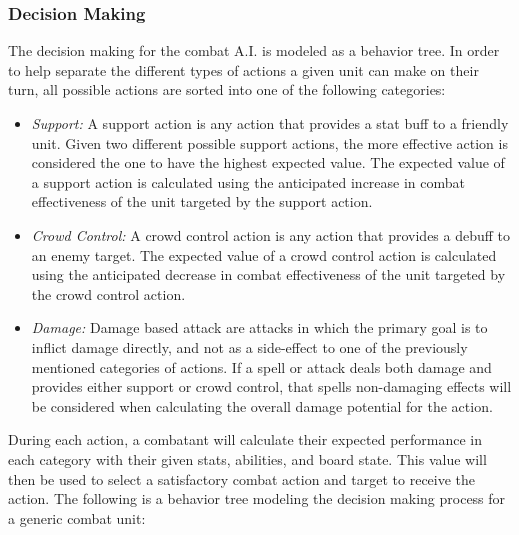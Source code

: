 \documentclass[letterpaper, 10 pt, conference]{ieeeconf}
\begin{document}
\subsubsection{Decision Making}
The decision making for the combat A.I. is modeled as a behavior tree. In order to help separate the different types of actions a given unit can make
on their turn, all possible actions are sorted into one of the following categories:
\begin{itemize}
	\item \textit{Support:}  A support action is any action that provides a stat buff to a
	friendly unit. Given two different possible support actions, the more effective
	action is considered the one to have the highest expected value. The
	expected value of a support action is calculated using the anticipated increase
	in combat effectiveness of the unit targeted by the support action. \\
	\item \textit{Crowd Control:} A crowd control action is any action that provides a
	debuff to an enemy target. The expected value of a crowd control action is
	calculated using the anticipated decrease in combat effectiveness of the unit
	targeted by the crowd control action. \\
	\item \textit{Damage:} Damage based attack are attacks in which the primary goal is
	to inflict damage directly, and not as a side-effect to one of the previously
	mentioned categories of actions. If a spell or attack deals both damage and
	provides either support or crowd control, that spells non-damaging effects
	will be considered when calculating the overall damage potential for the
	action.
\end{itemize}
\par
During each action, a combatant will calculate their expected performance in
each category with their given stats, abilities, and board state. This value will
then be used to select a satisfactory combat action and target to receive the action.
The following is a behavior tree modeling the decision making process for a
generic combat unit:
\end{document}
